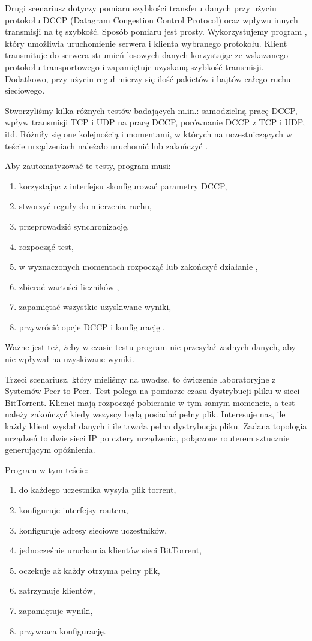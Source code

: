 \documentclass[00-praca-magisterska.tex]{subfiles}
\begin{document}
Drugi scenariusz dotyczy pomiaru szybkości transferu danych przy użyciu
protokołu DCCP (Datagram Congestion Control Protocol) oraz wpływu innych
transmisji na tę szybkość. Sposób pomiaru jest prosty. Wykorzystujemy program
, który umożliwia uruchomienie serwera i klienta wybranego
protokołu. Klient transmituje do serwera strumień losowych danych korzystając
ze wskazanego protokołu transportowego i zapamiętuje uzyskaną szybkość
transmisji. Dodatkowo, przy użyciu reguł  mierzy się ilość
pakietów i bajtów całego ruchu sieciowego.

Stworzyliśmy kilka różnych testów badających m.in.: samodzielną pracę DCCP,
wpływ transmisji TCP i UDP na pracę DCCP, porównanie DCCP z TCP i UDP, itd.
Różniły się one kolejnością i momentami, w których na uczestniczących w teście
urządzeniach należało uruchomić lub zakończyć .

Aby zautomatyzować te testy, program musi:
\begin{enumerate}
\item korzystając z interfejsu  skonfigurować parametry DCCP,
\item stworzyć reguły  do mierzenia ruchu,
\item przeprowadzić synchronizację, 
\item rozpocząć test,
\item w wyznaczonych momentach rozpocząć lub zakończyć działanie ,
\item zbierać wartości liczników ,
\item zapamiętać wszystkie uzyskiwane wyniki,
\item przywrócić opcje DCCP i konfigurację .
\end{enumerate}

Ważne jest też, żeby w czasie testu program nie przesyłał żadnych danych, aby
nie wpływał na uzyskiwane wyniki.

Trzeci scenariusz, który mieliśmy na uwadze, to ćwiczenie laboratoryjne z
Systemów Peer-to-Peer. Test polega na pomiarze czasu dystrybucji pliku w sieci
BitTorrent. Klienci mają rozpocząć pobieranie w tym samym momencie, a test należy
zakończyć kiedy wszyscy będą posiadać pełny plik. Interesuje nas, ile każdy
klient wysłał danych i ile trwała pełna dystrybucja pliku. Zadana topologia
urządzeń to dwie sieci IP po cztery urządzenia, połączone routerem sztucznie
generującym opóźnienia.

Program w tym teście:
\begin{enumerate}
\item do każdego uczestnika wysyła plik torrent,
\item konfiguruje interfejsy routera,
\item konfiguruje adresy sieciowe uczestników,
\item jednocześnie uruchamia klientów sieci BitTorrent,
\item oczekuje aż każdy otrzyma pełny plik,
\item zatrzymuje klientów,
\item zapamiętuje wyniki,
\item przywraca konfigurację.
\end{enumerate}
\end{document}
